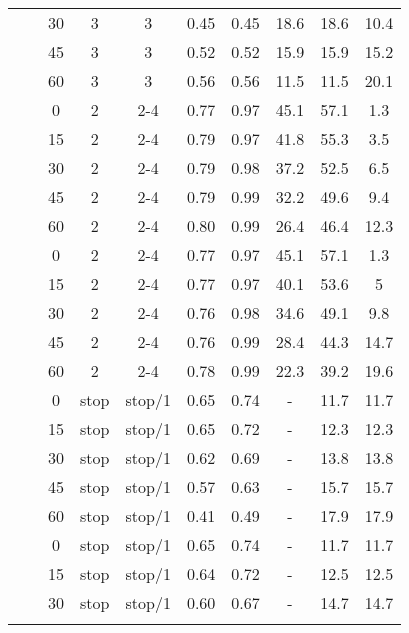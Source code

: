 \begin{longtable}[t]{cccccccccc}
\nopagebreak
&  & 30 & 3 & 3 & 0.45 & 0.45 & 18.6 & 18.6 & 10.4\\
\nopagebreak
&  & 45 & 3 & 3 & 0.52 & 0.52 & 15.9 & 15.9 & 15.2\\
\nopagebreak
\multirow{-10}{*}{\centering\arraybackslash 9} & \multirow{-5}{*}{\centering\arraybackslash 0.33} & 60 & 3 & 3 & 0.56 & 0.56 & 11.5 & 11.5 & 20.1\\
\cmidrule{1-10}\pagebreak[0]
&  & 0 & 2 & 2-4 & 0.77 & 0.97 & 45.1 & 57.1 & 1.3\\
\nopagebreak
&  & 15 & 2 & 2-4 & 0.79 & 0.97 & 41.8 & 55.3 & 3.5\\
\nopagebreak
&  & 30 & 2 & 2-4 & 0.79 & 0.98 & 37.2 & 52.5 & 6.5\\
\nopagebreak
&  & 45 & 2 & 2-4 & 0.79 & 0.99 & 32.2 & 49.6 & 9.4\\
\nopagebreak
& \multirow{-5}{*}{\centering\arraybackslash 0.2} & 60 & 2 & 2-4 & 0.80 & 0.99 & 26.4 & 46.4 & 12.3\\
\nopagebreak
&  & 0 & 2 & 2-4 & 0.77 & 0.97 & 45.1 & 57.1 & 1.3\\
\nopagebreak
&  & 15 & 2 & 2-4 & 0.77 & 0.97 & 40.1 & 53.6 & 5\\
\nopagebreak
&  & 30 & 2 & 2-4 & 0.76 & 0.98 & 34.6 & 49.1 & 9.8\\
\nopagebreak
&  & 45 & 2 & 2-4 & 0.76 & 0.99 & 28.4 & 44.3 & 14.7\\
\nopagebreak
\multirow{-10}{*}{\centering\arraybackslash 10} & \multirow{-5}{*}{\centering\arraybackslash 0.33} & 60 & 2 & 2-4 & 0.78 & 0.99 & 22.3 & 39.2 & 19.6\\
\cmidrule{1-10}\pagebreak[0]
&  & 0 & stop & stop/1 & 0.65 & 0.74 & - & 11.7 & 11.7\\
\nopagebreak
&  & 15 & stop & stop/1 & 0.65 & 0.72 & - & 12.3 & 12.3\\
\nopagebreak
&  & 30 & stop & stop/1 & 0.62 & 0.69 & - & 13.8 & 13.8\\
\nopagebreak
&  & 45 & stop & stop/1 & 0.57 & 0.63 & - & 15.7 & 15.7\\
\nopagebreak
& \multirow{-5}{*}{\centering\arraybackslash 0.2} & 60 & stop & stop/1 & 0.41 & 0.49 & - & 17.9 & 17.9\\
\nopagebreak
&  & 0 & stop & stop/1 & 0.65 & 0.74 & - & 11.7 & 11.7\\
\nopagebreak
&  & 15 & stop & stop/1 & 0.64 & 0.72 & - & 12.5 & 12.5\\
\nopagebreak
&  & 30 & stop & stop/1 & 0.60 & 0.67 & - & 14.7 & 14.7\\
\nopagebreak

\end{longtable}
